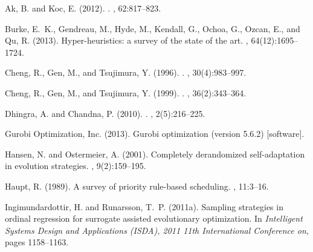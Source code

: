 \documentclass[a4paper,twoside]{article}
\begin{document}
\clearpage

{\small

%
\begin{thebibliography}{}

Ak, B. and Koc, E. (2012).
.
, 62:817--823.

Burke, E.~K., Gendreau, M., Hyde, M., Kendall, G., Ochoa, G., Ozcan, E., and
  Qu, R. (2013).
\newblock Hyper-heuristics: a survey of the state of the art.
, 64(12):1695--1724.

Cheng, R., Gen, M., and Tsujimura, Y. (1996).
.
, 30(4):983--997.

Cheng, R., Gen, M., and Tsujimura, Y. (1999).
.
, 36(2):343--364.

Dhingra, A. and Chandna, P. (2010).
.
,
  2(5):216--225.

{Gurobi Optimization, Inc.} (2013).
\newblock Gurobi optimization (version 5.6.2) [software].

Hansen, N. and Ostermeier, A. (2001).
\newblock Completely derandomized self-adaptation in evolution strategies.
, 9(2):159--195.

Haupt, R. (1989).
\newblock A survey of priority rule-based scheduling.
, 11:3--16.

Ingimundardottir, H. and Runarsson, T.~P. (2011a).
\newblock Sampling strategies in ordinal regression for surrogate assisted
  evolutionary optimization.
\newblock In {\em Intelligent Systems Design and Applications (ISDA), 2011 11th
  International Conference on}, pages 1158--1163.


\end{thebibliography}}
\end{document}
